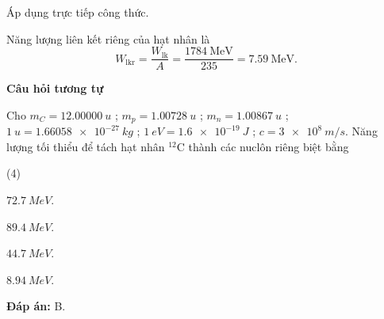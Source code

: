 \begin{dang}{Áp dụng trực tiếp công thức.}
{	Năng lượng liên kết riêng của hạt nhân là
	\begin{equation*}
	W_\text{lkr}=\dfrac{W_\text{lk}}{A}=\dfrac{\SI{1784}{\mega\electronvolt}}{235}=\SI{7,59}{\mega\electronvolt}.
	\end{equation*}
	
	\begin{center}
		\textbf{Câu hỏi tương tự}
	\end{center}
Cho $ m_{C} = \SI{12,00000}{u} $ ; $ m_{p} = \SI{1,00728}{u} $ ; $ m_{n} = \SI{1,00867}{u} $ ; $ \SI{1}{u} = \SI{1,66058 e-27}{kg} $ ; $ \SI{1}{eV} = \SI{1,6 e-19}{J} $ ; $ c = \SI{3 e8}{m/s} $. Năng lượng tối thiểu để tách hạt nhân $ ^{12} \text{C} $ thành các nuclôn riêng biệt bằng
\begin{mcq}(4)
	\item $ \SI{72,7}{MeV} $.
	\item $ \SI{89,4}{MeV} $.
	\item $ \SI{44,7}{MeV} $.
	\item $ \SI{8,94}{MeV} $.
\end{mcq}
	
	\textbf{Đáp án:} B.
}

\end{dang}

